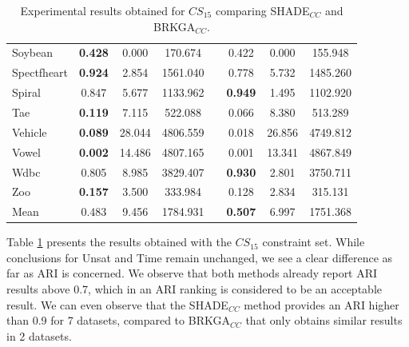 \documentclass[review]{elsarticle}
\begin{document}
\begin{table}[!h]
{\begin{tabular}{l ccc c ccc}
			Soybean & \textbf{0.428} & 0.000 & 170.674 && 0.422 & 0.000 & 155.948 \\
			Spectfheart & \textbf{0.924} & 2.854 & 1561.040 && 0.778 & 5.732 & 1485.260 \\
			Spiral & 0.847 & 5.677 & 1133.962 && \textbf{0.949} & 1.495 & 1102.920 \\
			Tae & \textbf{0.119} & 7.115 & 522.088 && 0.066 & 8.380 & 513.289 \\
			Vehicle & \textbf{0.089} & 28.044 & 4806.559 && 0.018 & 26.856 & 4749.812 \\
			Vowel & \textbf{0.002} & 14.486 & 4807.165 && 0.001 & 13.341 & 4867.849 \\
			Wdbc & 0.805 & 8.985 & 3829.407 && \textbf{0.930} & 2.801 & 3750.711 \\
			Zoo & \textbf{0.157} & 3.500 & 333.984 && 0.128 & 2.834 & 315.131 \\
			\hline
			Mean & 0.483 & 9.456 & 1784.931 && \textbf{0.507} & 6.997 & 1751.368 \\
			\hline

		\end{tabular}}

	\caption{Experimental results obtained for $CS_{15}$ comparing SHADE$_{CC}$ and BRKGA$_{CC}$.}
	\label{tab:results15}
\end{table}

Table \ref{tab:results15} presents the results obtained with the $CS_{15}$ constraint set. While conclusions for Unsat and Time remain unchanged, we see a clear difference as far as ARI is concerned. We observe that both methods already report ARI results above 0.7, which in an ARI ranking is considered to be an acceptable result. We can even observe that the SHADE$_{CC}$ method provides an ARI higher than 0.9 for 7 datasets, compared to BRKGA$_{CC}$ that only obtains similar results in 2 datasets.
\end{document}
